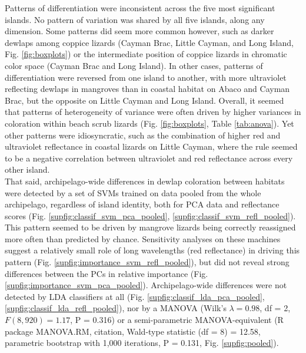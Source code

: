 Patterns of differentiation were inconsistent across the five most significant islands. No pattern of variation was shared by all five islands, along any dimension. Some patterns did seem more common however, such as darker dewlaps among coppice lizards (Cayman Brac, Little
Cayman, and Long Island, Fig. \ref{fig:boxplots}) or the intermediate position of coppice lizards in chromatic color space (Cayman Brac and Long Island). In other cases, patterns of differentiation were reversed from one island to another, with more ultraviolet reflecting dewlaps in mangroves than in coastal habitat on Abaco and Cayman Brac, but the opposite on Little Cayman and Long Island. Overall, it seemed that patterns of heterogeneity of variance were often driven by higher variances in coloration within beach scrub lizards (Fig. \ref{fig:boxplots}, Table \ref{tab:anova}). Yet other patterns were idiosyncratic, such as the combination of higher red and ultraviolet reflectance in coastal lizards on Little Cayman, where the rule seemed to be a negative correlation between ultraviolet and red reflectance across every other island.\\

That said, archipelago-wide differences in dewlap coloration between habitats were detected by a set of SVMs trained on data pooled from the whole archipelago, regardless of island identity, both for PCA data and reflectance scores (Fig. \ref{supfig:classif_svm_pca_pooled}, \ref{supfig:classif_svm_refl_pooled}). This pattern seemed to be driven by mangrove lizards being correctly reassigned more often than predicted by chance. Sensitivity analyses on these machines suggest a relatively small role of long wavelengths (red reflectance) in driving this pattern (Fig. \ref{supfig:importance_svm_refl_pooled}), but did not reveal strong differences between the PCs in relative importance (Fig. \ref{supfig:importance_svm_pca_pooled}).  Archipelago-wide differences were not detected by LDA classifiers at all (Fig. \ref{supfig:classif_lda_pca_pooled}, \ref{supfig:classif_lda_refl_pooled}), nor by a MANOVA (Wilk's $\lambda = 0.98$, df = 2, $F(8,920)=1.17$, P = 0.316) or a semi-parametric MANOVA-equivalent (R package MANOVA.RM, citation, Wald-type statistic (df = 8) = 12.58, parametric bootstrap with 1,000 iterations, P = 0.131, Fig. \ref{supfig:pooled}).\\


